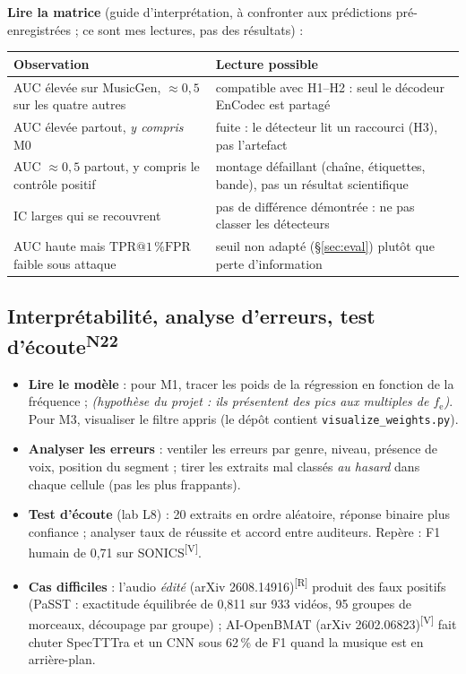 \documentclass[10pt,a4paper]{article}
\makeatletter
\newcommand{\sV}{\textsuperscript{\scriptsize\textcolor{green!40!black}{[V]}}}
\newcommand{\sR}{\textsuperscript{\scriptsize\textcolor{orange!80!black}{[R]}}}
\newcommand{\tprfpr}{\mathrm{TPR}@1\,\%\mathrm{FPR}}
\newcommand{\hyp}[1]{\textit{(hypothèse du projet : #1)}}
\newcommand{\nref}[1]{\textsuperscript{\scriptsize\textcolor{black!55}{#1}}}
\makeatother
\begin{document}
\textbf{Lire la matrice} (guide d'interprétation, à confronter aux prédictions pré-enregistrées ; ce sont mes lectures, pas des résultats) :
\begin{center}\footnotesize
\begin{tabularx}{\textwidth}{@{}L{5.6cm}X@{}}
\toprule
\textbf{Observation} & \textbf{Lecture possible}\\
\midrule
AUC élevée sur MusicGen, $\ensuremath{\approx}0{,}5$ sur les quatre autres & compatible avec H1--H2 : seul le décodeur EnCodec est partagé\\
AUC élevée partout, \emph{y compris} M0 & fuite : le détecteur lit un raccourci (H3), pas l'artefact\\
AUC $\ensuremath{\approx}0{,}5$ partout, y compris le contrôle positif & montage défaillant (chaîne, étiquettes, bande), pas un résultat scientifique\\
IC larges qui se recouvrent & pas de différence démontrée : ne pas classer les détecteurs\\
AUC haute mais $\tprfpr$ faible sous attaque & seuil non adapté (§\ref{sec:eval}) plutôt que perte d'information\\
\bottomrule
\end{tabularx}
\end{center}

\subsection{Interprétabilité, analyse d'erreurs, test d'écoute\nref{N22}}
\begin{itemize}
  \item \textbf{Lire le modèle} : pour M1, tracer les poids de la régression en fonction de la fréquence ; \hyp{ils présentent des pics aux multiples de $f_{\mathrm e}$}. Pour M3, visualiser le filtre appris (le dépôt contient \texttt{visualize\_weights.py}).
  \item \textbf{Analyser les erreurs} : ventiler les erreurs par genre, niveau, présence de voix, position du segment ; tirer les extraits mal classés \emph{au hasard} dans chaque cellule (pas les plus frappants).
  \item \textbf{Test d'écoute} (lab L8) : 20 extraits en ordre aléatoire, réponse binaire plus confiance ; analyser taux de réussite et accord entre auditeurs. Repère : F1 humain de 0,71 sur SONICS\sV.
  \item \textbf{Cas difficiles} : l'audio \emph{édité} (arXiv 2608.14916)\sR{} produit des faux positifs (PaSST : exactitude équilibrée de 0,811 sur 933 vidéos, 95 groupes de morceaux, découpage par groupe) ; AI-OpenBMAT (arXiv 2602.06823)\sV{} fait chuter SpecTTTra et un CNN sous 62\,\% de F1 quand la musique est en arrière-plan.
\end{itemize}
\end{document}
